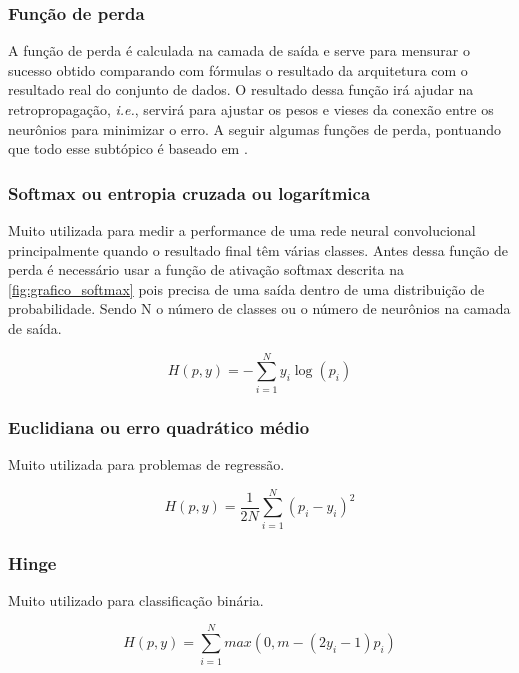 \subsubsection*{Função de perda}

A função de perda é calculada na camada de saída e serve para mensurar o sucesso obtido comparando com fórmulas o resultado da arquitetura com o resultado real do conjunto de dados. O resultado dessa função irá ajudar na retropropagação, \emph{i.e.}, servirá para ajustar os pesos e vieses da conexão entre os neurônios para minimizar o erro. A seguir algumas funções de perda, pontuando que todo esse subtópico é baseado em 
.

\subsubsection*{Softmax ou entropia cruzada ou logarítmica}

Muito utilizada para medir a performance de uma rede neural convolucional principalmente quando o resultado final têm várias classes. Antes dessa função de perda é necessário usar a função de ativação softmax descrita na \cref{fig:grafico_softmax} pois precisa de uma saída dentro de uma distribuição de probabilidade. Sendo N o número de classes ou o número de neurônios na camada de saída.

$$H(p,y) = -\sum_{i=1}^N y_i \log(p_i)$$

\subsubsection*{Euclidiana ou erro quadrático médio}

Muito utilizada para problemas de regressão.

$$H(p,y) = \frac{1}{2N} \sum_{i=1}^N (p_i - y_i)^2$$

\subsubsection*{Hinge}

Muito utilizado para classificação binária.

$$H(p,y) = \sum_{i=1}^N max(0, m - (2y_i - 1) p_i)$$
